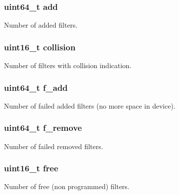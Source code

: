 \subsubsection[{add}]{\setlength{\rightskip}{0pt plus 5cm}uint64\+\_\+t add}\label{structrte__eth__fdir_ac36885456d6bcecbaa4c398f13f40608}
Number of added filters. \hypertarget{structrte__eth__fdir_a25acdd048286f86d35913474e7f0f41a}{}
\subsubsection[{collision}]{\setlength{\rightskip}{0pt plus 5cm}uint16\+\_\+t collision}\label{structrte__eth__fdir_a25acdd048286f86d35913474e7f0f41a}
Number of filters with collision indication. \hypertarget{structrte__eth__fdir_ac31d973a80c54b421052347487624a9d}{}
\subsubsection[{f\+\_\+add}]{\setlength{\rightskip}{0pt plus 5cm}uint64\+\_\+t f\+\_\+add}\label{structrte__eth__fdir_ac31d973a80c54b421052347487624a9d}
Number of failed added filters (no more space in device). \hypertarget{structrte__eth__fdir_ad6019034f869934701c2518978e7be0c}{}
\subsubsection[{f\+\_\+remove}]{\setlength{\rightskip}{0pt plus 5cm}uint64\+\_\+t f\+\_\+remove}\label{structrte__eth__fdir_ad6019034f869934701c2518978e7be0c}
Number of failed removed filters. \hypertarget{structrte__eth__fdir_a726dbe40127a1f14bf8e72ab94453698}{}
\subsubsection[{free}]{\setlength{\rightskip}{0pt plus 5cm}uint16\+\_\+t free}\label{structrte__eth__fdir_a726dbe40127a1f14bf8e72ab94453698}
Number of free (non programmed) filters. \hypertarget{structrte__eth__fdir_a4831f0a60028910696c19abb4cd2c93c}{}
